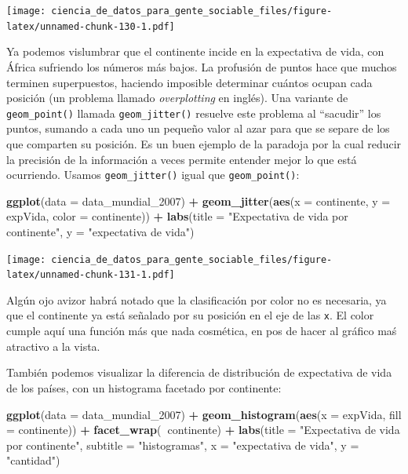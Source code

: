 \documentclass[spanish,]{book}
\newenvironment{Shaded}{\begin{snugshade}}{\end{snugshade}}
\newcommand{\DataTypeTok}[1]{\textcolor[rgb]{0.13,0.29,0.53}{#1}}
\newcommand{\DecValTok}[1]{\textcolor[rgb]{0.00,0.00,0.81}{#1}}
\newcommand{\KeywordTok}[1]{\textcolor[rgb]{0.13,0.29,0.53}{\textbf{#1}}}
\newcommand{\NormalTok}[1]{#1}
\newcommand{\OperatorTok}[1]{\textcolor[rgb]{0.81,0.36,0.00}{\textbf{#1}}}
\newcommand{\StringTok}[1]{\textcolor[rgb]{0.31,0.60,0.02}{#1}}
\begin{document}
\texttt{[image: ciencia\_de\_datos\_para\_gente\_sociable\_files/figure-latex/unnamed-chunk-130-1.pdf]}

Ya podemos vislumbrar que el continente incide en la expectativa de vida, con África sufriendo los números más bajos. La profusión de puntos hace que muchos terminen superpuestos, haciendo imposible determinar cuántos ocupan cada posición (un problema llamado \emph{overplotting} en inglés). Una variante de \texttt{geom\_point()} llamada \texttt{geom\_jitter()} resuelve este problema al ``sacudir'' los puntos, sumando a cada uno un pequeño valor al azar para que se separe de los que comparten su posición. Es un buen ejemplo de la paradoja por la cual reducir la precisión de la información a veces permite entender mejor lo que está ocurriendo. Usamos \texttt{geom\_jitter()} igual que \texttt{geom\_point()}:

\begin{Shaded}
\begin{Highlighting}[]
\KeywordTok{ggplot}\NormalTok{(}\DataTypeTok{data =}\NormalTok{ data_mundial_}\DecValTok{2007}\NormalTok{) }\OperatorTok{+}
\StringTok{    }\KeywordTok{geom_jitter}\NormalTok{(}\KeywordTok{aes}\NormalTok{(}\DataTypeTok{x =}\NormalTok{ continente, }\DataTypeTok{y =}\NormalTok{ expVida, }\DataTypeTok{color =}\NormalTok{ continente)) }\OperatorTok{+}
\StringTok{    }\KeywordTok{labs}\NormalTok{(}\DataTypeTok{title =} \StringTok{"Expectativa de vida por continente"}\NormalTok{,}
         \DataTypeTok{y =} \StringTok{"expectativa de vida"}\NormalTok{)}
\end{Highlighting}
\end{Shaded}

\texttt{[image: ciencia\_de\_datos\_para\_gente\_sociable\_files/figure-latex/unnamed-chunk-131-1.pdf]}

Algún ojo avizor habrá notado que la clasificación por color no es necesaria, ya que el continente ya está señalado por su posición en el eje de las \texttt{x}. El color cumple aquí una función más que nada cosmética, en pos de hacer al gráfico maś atractivo a la vista.

También podemos visualizar la diferencia de distribución de expectativa de vida de los países, con un histograma facetado por continente:

\begin{Shaded}
\begin{Highlighting}[]
\KeywordTok{ggplot}\NormalTok{(}\DataTypeTok{data =}\NormalTok{ data_mundial_}\DecValTok{2007}\NormalTok{) }\OperatorTok{+}
\StringTok{    }\KeywordTok{geom_histogram}\NormalTok{(}\KeywordTok{aes}\NormalTok{(}\DataTypeTok{x =}\NormalTok{ expVida, }\DataTypeTok{fill =}\NormalTok{ continente)) }\OperatorTok{+}
\StringTok{    }\KeywordTok{facet_wrap}\NormalTok{(}\OperatorTok{~}\NormalTok{continente) }\OperatorTok{+}
\StringTok{    }\KeywordTok{labs}\NormalTok{(}\DataTypeTok{title =} \StringTok{"Expectativa de vida por continente"}\NormalTok{,}
         \DataTypeTok{subtitle =} \StringTok{"histogramas"}\NormalTok{,}
        \DataTypeTok{x =} \StringTok{"expectativa de vida"}\NormalTok{,}
        \DataTypeTok{y =} \StringTok{"cantidad"}\NormalTok{)}
\end{Highlighting}
\end{Shaded}
\end{document}
